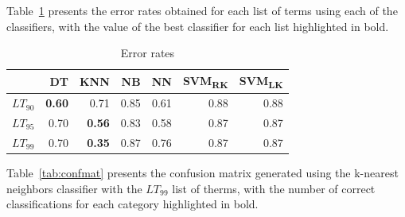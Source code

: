 \documentclass[conference]{IEEEtran}
\begin{document}
Table~\ref{tab:error} presents the error rates obtained for each list
of terms using each of the classifiers, with the value of the best
classifier for each list highlighted in bold.

\begin{table}[htbp]
    \vspace{-.2cm}
    \caption{Error rates}
\begin{center}
\begin{tabular}{l|rrrrrr}
                 & DT            & KNN           & NB   & NN   & SVM\textsubscript{RK} & SVM\textsubscript{LK} \\ \hline
    $LT_{90}$    & \textbf{0.60} & 0.71          & 0.85 & 0.61 & 0.88                  & 0.88                  \\
    $LT_{95}$    & 0.70          & \textbf{0.56} & 0.83 & 0.58 & 0.87                  & 0.87                  \\
    $LT_{99}$    & 0.70          & \textbf{0.35} & 0.87 & 0.76 & 0.87                  & 0.87                  \\
\end{tabular}
\label{tab:error}
\end{center}
\end{table}

Table~\ref{tab:confmat} presents the confusion matrix generated using
the k-nearest neighbors classifier with the $LT_{99}$ list of therms,
with the number of correct classifications for each category
highlighted in bold.
\end{document}
